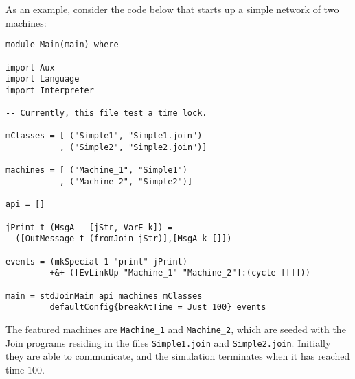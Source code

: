As an example, consider the code below that starts up a simple network of two
machines:
\begin{verbatim}
module Main(main) where

import Aux
import Language
import Interpreter

-- Currently, this file test a time lock.

mClasses = [ ("Simple1", "Simple1.join")
           , ("Simple2", "Simple2.join")]

machines = [ ("Machine_1", "Simple1")
           , ("Machine_2", "Simple2")]

api = []

jPrint t (MsgA _ [jStr, VarE k]) =
  ([OutMessage t (fromJoin jStr)],[MsgA k []])

events = (mkSpecial 1 "print" jPrint)
         +&+ ([EvLinkUp "Machine_1" "Machine_2"]:(cycle [[]]))

main = stdJoinMain api machines mClasses
         defaultConfig{breakAtTime = Just 100} events
\end{verbatim}

The featured machines are \texttt{Machine\_1} and \texttt{Machine\_2}, which are
seeded with the Join programs residing in the files \texttt{Simple1.join} and
\texttt{Simple2.join}. Initially they are able to communicate, and the
simulation terminates when it has reached time $100$.

